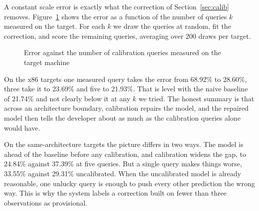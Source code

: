 \documentclass[runningheads]{llncs}
\begin{document}
A constant scale error is exactly what the correction of
Section~\ref{sec:calib} removes. Figure~\ref{fig:calib} shows the error as a
function of the number of queries $k$ measured on the target. For each $k$ we
draw the queries at random, fit the correction, and score the remaining
queries, averaging over 200 draws per target.

\begin{figure}[t]
\centering
{}
\caption{Error against the number of calibration queries measured on the
target machine}
\label{fig:calib}
\end{figure}

On the x86 targets one measured query takes the error from 68.92\% to
28.60\%, three take it to 23.69\% and five to 21.93\%. That is level with the
naive baseline of 21.74\% and not clearly below it at any $k$ we tried. The
honest summary is that across an architecture boundary, calibration repairs
the model, and the repaired model then tells the developer about as much as
the calibration queries alone would have.

On the same-architecture targets the picture differs in two ways. The model
is ahead of the baseline before any calibration, and calibration widens the
gap, to 24.84\% against 37.39\% at five queries. But a single query makes
things worse, 33.55\% against 29.31\% uncalibrated. When the uncalibrated
model is already reasonable, one unlucky query is enough to push every other
prediction the wrong way. This is why the system labels a correction built on
fewer than three observations as provisional.
\end{document}
